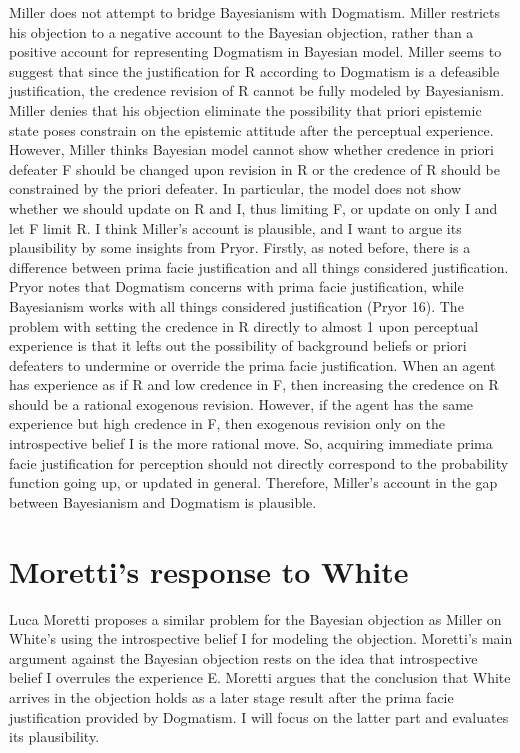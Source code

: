 Miller does not attempt to bridge Bayesianism with Dogmatism. Miller
restricts his objection to a negative account to the Bayesian objection,
rather than a positive account for representing Dogmatism in Bayesian
model. Miller seems to suggest that since the justification for R
according to Dogmatism is a defeasible justification, the credence
revision of R cannot be fully modeled by Bayesianism. Miller denies that
his objection eliminate the possibility that priori epistemic state
poses constrain on the epistemic attitude after the perceptual
experience. However, Miller thinks Bayesian model cannot show whether
credence in priori defeater F should be changed upon revision in R or
the credence of R should be constrained by the priori defeater. In
particular, the model does not show whether we should update on R and I,
thus limiting F, or update on only I and let F limit R. I think Miller's
account is plausible, and I want to argue its plausibility by some
insights from Pryor. Firstly, as noted before, there is a difference
between prima facie justification and all things considered
justification. Pryor notes that Dogmatism concerns with prima facie
justification, while Bayesianism works with all things considered
justification (Pryor 16). The problem with setting the credence in R
directly to almost 1 upon perceptual experience is that it lefts out the
possibility of background beliefs or priori defeaters to undermine or
override the prima facie justification. When an agent has experience as
if R and low credence in F, then increasing the credence on R should be
a rational exogenous revision. However, if the agent has the same
experience but high credence in F, then exogenous revision only on the
introspective belief I is the more rational move. So, acquiring
immediate prima facie justification for perception should not directly
correspond to the probability function going up, or updated in general.
Therefore, Miller's account in the gap between Bayesianism and Dogmatism
is plausible.

\section{Moretti's response to White}

Luca Moretti proposes a similar problem for the Bayesian objection as
Miller on White's using the introspective belief I for modeling the
objection. Moretti's main argument against the Bayesian objection rests
on the idea that introspective belief I overrules the experience E.
Moretti argues that the conclusion that White arrives in the objection
holds as a later stage result after the prima facie justification
provided by Dogmatism. I will focus on the latter part and evaluates its
plausibility.

